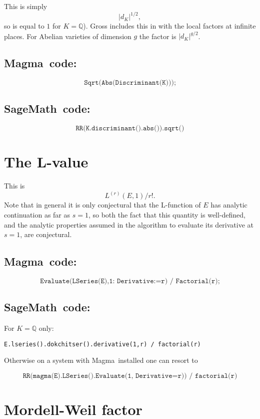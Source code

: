 \documentclass{amsart}
\newcommand{\software}[1]{\textsf{#1}} %
\newcommand{\Sage}{\software{SageMath}{}\ }
\newcommand{\Magma}{\software{Magma}{}\ }
\newcommand\Q{\mathbb{Q}}
\begin{document}
This is simply \[|d_K|^{1/2},\] so is equal to \(1\) for \(K=\Q\)).
Gross includes this in with the local factors at infinite places. For
Abelian varieties of dimension \(g\) the factor is \(|d_K|^{g/2}\).

\subsection{\Magma code:}\label{magma-1}

\[
\texttt{Sqrt(Abs(Discriminant(K)));}
\]

\subsection{\Sage code:}\label{sage-1}

\[
\texttt{RR(K.discriminant().abs()).sqrt()}
\]

\section{The L-value}\label{the-l-value}

This is \[L^{(r)}(E,1)/r!.\] Note that in general it is only conjectural
that the L-function of \(E\) has analytic continuation as far as
\(s=1\), so both the fact that this quantity is well-defined, and the
analytic properties assumed in the algorithm to evaluate its derivative
at \(s=1\), are conjectural.

\subsection{\Magma code:}\label{magma-2}

\[
\texttt{Evaluate(LSeries(E),1:\ Derivative:=r)\ /\ Factorial(r);}
\]

\subsection{\Sage code:}\label{sage-2}

For \(K=\Q\) only:

\texttt{E.lseries().dokchitser().derivative(1,r)\ /\ factorial(r)}

Otherwise on a system with \Magma installed one can resort to

\[
\texttt{RR(magma(E).LSeries().Evaluate(1,\ Derivative=r))\ /\ factorial(r)}
\]

\section{Mordell-Weil factor}\label{mordell-weil-factor}
\end{document}
